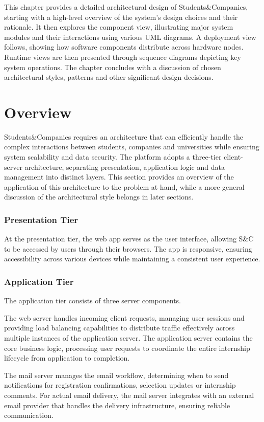 This chapter provides a detailed architectural design of Students\&Companies, starting with a high-level overview of the system's design choices and their rationale.
It then explores the component view, illustrating major system modules and their interactions using various UML diagrams.
A deployment view follows, showing how software components distribute across hardware nodes.
Runtime views are then presented through sequence diagrams depicting key system operations.
The chapter concludes with a discussion of chosen architectural styles, patterns and other significant design decisions.

\section{Overview}
Students\&Companies requires an architecture that can efficiently handle the complex interactions between students, companies and universities while ensuring system scalability and data security.
The platform adopts a three-tier client-server architecture, separating presentation, application logic and data management into distinct layers.
This section provides an overview of the application of this architecture to the problem at hand, while a more general discussion of the architectural style belongs in later sections.

\subsubsection{Presentation Tier}
At the presentation tier, the web app serves as the user interface, allowing S\&C to be accessed by users through their browsers.
The app is responsive, ensuring accessibility across various devices while maintaining a consistent user experience.

\subsubsection{Application Tier}
The application tier consists of three server components.

The web server handles incoming client requests, managing user sessions and providing load balancing capabilities to distribute traffic effectively across multiple instances of the application server.
The application server contains the core business logic, processing user requests to coordinate the entire internship lifecycle from application to completion.

The mail server manages the email workflow, determining when to send notifications for registration confirmations, selection updates or internship comments.
For actual email delivery, the mail server integrates with an external email provider that handles the delivery infrastructure, ensuring reliable communication.

